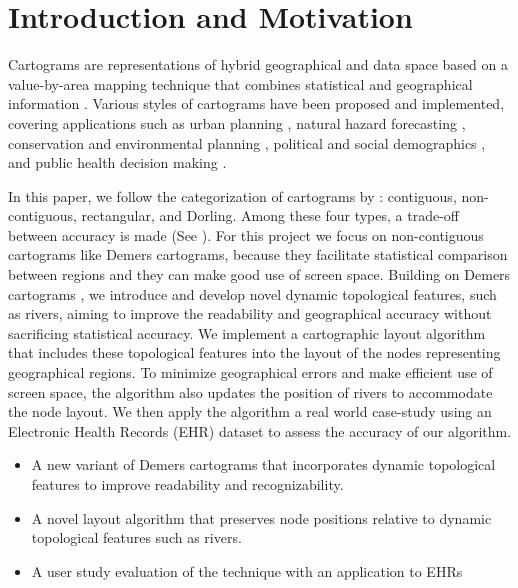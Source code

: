 \section{Introduction and Motivation}

Cartograms are representations of hybrid geographical and data space based on a value-by-area mapping technique that combines statistical and geographical information \cite{dent2009Cartography}. Various styles of cartograms have been proposed and implemented, covering applications such as urban planning \cite{harris2018Mapping, arranz-lopez2021Enduser}, natural hazard forecasting \cite{pappenberger2019Cartograms, park2020Flood}, conservation and environmental planning \cite{galluzzi2018Mapping, rocchini2019Cartogramming}, political and social demographics \cite{breitzman2018Using, alieva2021How}, and public health decision making \cite{gao2020Visualising, sack2021Visualizing}.

In this paper, we follow the categorization of cartograms by : contiguous, non-contiguous, rectangular, and Dorling. Among these four types, a trade-off between accuracy is made (See ). For this project we focus on non-contiguous cartograms like Demers cartograms, because they facilitate statistical comparison between regions and they can make good use of screen space. Building on Demers cartograms \cite{ian2002Cartogram}, we introduce and develop novel dynamic topological features, such as rivers, aiming to improve the readability and geographical accuracy without sacrificing statistical accuracy. We implement a cartographic layout algorithm that includes these topological features into the layout of the nodes representing geographical regions. To minimize geographical errors and make efficient use of screen space, the algorithm also updates the position of rivers to accommodate the node layout. We then apply the algorithm a real world case-study using an Electronic Health Records (EHR) dataset to assess the accuracy of our algorithm.


\begin{itemize}
    \item A new variant of Demers cartograms that incorporates dynamic topological features to improve readability and recognizability.
    \item A novel layout algorithm that preserves node positions relative to dynamic topological features such as rivers.
    \item A user study evaluation of the technique with an application to EHRs
\end{itemize}
